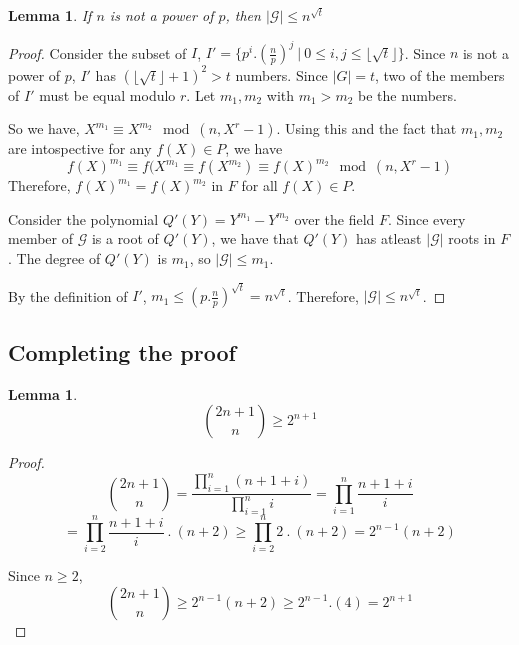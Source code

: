 \documentclass[11pt]{article}
\newtheorem{lemma}[theorem]{Lemma}
\begin{document}
\begin{lemma}
\label{lemma:GUpperBound}
If $n$ is not a power of $p$, then $|\mathcal{G}| \leq n^{\sqrt{t}}$
\end{lemma}
\begin{proof}
Consider the subset of $I$, $I' = \{p^i.(\frac{n}{p})^j\ |\ 0 \leq i, j \leq \lfloor \sqrt{t} \rfloor \}$.
Since $n$ is not a power of $p$, $I'$ has $(\lfloor \sqrt{t} \rfloor + 1)^2 > t$ numbers. Since $|G| = t$, two of the members of $I'$ must be equal modulo $r$. Let $m_1, m_2$ with $m_1 > m_2$ be the numbers. 

So we have, $X^{m_1} \equiv X^{m_2} \mod (n, X^r-1)$. Using this and the fact that $m_1, m_2$ are intospective for any $f(X) \in P$, we have 
\[f(X)^{m_1} \equiv f(X^{m_1} \equiv f(X^{m_2}) \equiv f(X)^{m_2} \mod (n, X^r-1)\]
Therefore, $f(X)^{m_1} = f(X)^{m_2}$ in $F$ for all $f(X) \in P$. 

Consider the polynomial $Q'(Y) = Y^{m_1} - Y^{m_2}$ over the field $F$. Since every member of $\mathcal{G}$ is a root of $Q'(Y)$, we have that $Q'(Y)$ has atleast $|\mathcal{G}|$ roots in $F$. The degree of $Q'(Y)$ is $m_1$, so $|\mathcal{G}| \leq m_1$.

By the definition of $I'$, $m_1 \leq (p.\frac{n}{p})^{\sqrt{t}} = n^{\sqrt{t}}$. Therefore, $|\mathcal{G}| \leq n^{\sqrt{t}}$.

\end{proof}

\subsection{Completing the proof}
\begin{lemma}
\label{lemma:CombinationsLemma}
\[{2n+1 \choose n} \geq 2^{n+1}\]
\end{lemma}
\begin{proof}
\[{2n+1 \choose n} = \frac{\prod_{i=1}^{n}(n+1+i)}{\prod_{i=1}^{n}{i}} = \prod_{i=1}^{n}\frac{n+1+i}{i}\]
\[ = \prod_{i=2}^{n}\frac{n+1+i}{i}\ .\ (n+2) \geq \prod_{i=2}^{n}2\ .\ (n+2) = 2^{n-1}(n+2)\]

Since $n \geq 2$,
\[{2n+1 \choose n} \geq 2^{n-1}(n+2) \geq 2^{n-1}.(4) = 2^{n+1}\]
\[\]
\end{proof}
\end{document}
